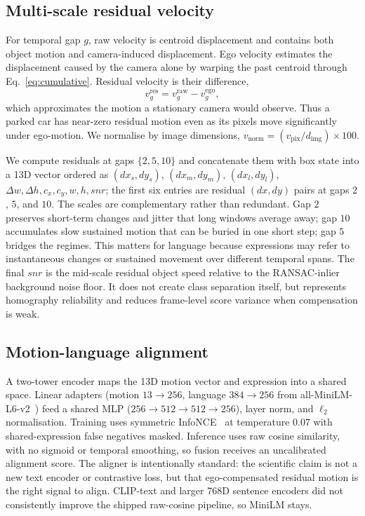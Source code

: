 \documentclass[sigconf,anonymous,nonacm]{acmart}
\begin{document}
\subsection{Multi-scale residual velocity}
\label{sec:residual}

For temporal gap $g$, raw velocity is centroid displacement and contains both object motion and camera-induced displacement. Ego velocity estimates the displacement caused by the camera alone by warping the past centroid through Eq.~\ref{eq:cumulative}. Residual velocity is their difference,
\begin{equation}
v^{\mathrm{res}}_{g} = v^{\mathrm{raw}}_{g} - v^{\mathrm{ego}}_{g},
\label{eq:residual}
\end{equation}
which approximates the motion a stationary camera would observe. Thus a parked car has near-zero residual motion even as its pixels move significantly under ego-motion. We normalise by image dimensions, $v_{\mathrm{norm}} = (v_{\mathrm{pix}}/d_{\mathrm{img}})\times 100$.

We compute residuals at gaps $\{2,5,10\}$ and concatenate them with box state into a 13D vector ordered as $(\mathit{dx}_s,\mathit{dy}_s)$, $(\mathit{dx}_m,\mathit{dy}_m)$, $(\mathit{dx}_l,\mathit{dy}_l)$, $\Delta w,\Delta h,c_x,c_y,w,h,\mathit{snr}$; the first six entries are residual $(dx,dy)$ pairs at gaps $2$, $5$, and $10$. The scales are complementary rather than redundant. Gap $2$ preserves short-term changes and jitter that long windows average away; gap $10$ accumulates slow sustained motion that can be buried in one short step; gap $5$ bridges the regimes. This matters for language because expressions may refer to instantaneous changes or sustained movement over different temporal spans. The final $\mathit{snr}$ is the mid-scale residual object speed relative to the RANSAC-inlier background noise floor. It does not create class separation itself, but represents homography reliability and reduces frame-level score variance when compensation is weak.

\subsection{Motion-language alignment}
\label{sec:align}

A two-tower encoder maps the 13D motion vector and expression into a shared space. Linear adapters (motion $13\!\to\!256$, language $384\!\to\!256$ from all-MiniLM-L6-v2~\cite{sbert}) feed a shared MLP ($256\!\to\!512\!\to\!512\!\to\!256$), layer norm, and $\ell_2$ normalisation. Training uses symmetric InfoNCE~\cite{infonce} at temperature $0.07$ with shared-expression false negatives masked. Inference uses raw cosine similarity, with no sigmoid or temporal smoothing, so fusion receives an uncalibrated alignment score. The aligner is intentionally standard: the scientific claim is not a new text encoder or contrastive loss, but that ego-compensated residual motion is the right signal to align. CLIP-text and larger 768D sentence encoders did not consistently improve the shipped raw-cosine pipeline, so MiniLM stays.
\end{document}
